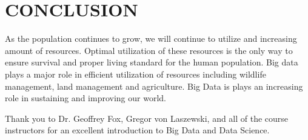 \documentclass[sigconf]{acmart}
\begin{document}
\section{CONCLUSION}
As the population continues to grow, we will continue to utilize and increasing amount of resources.  Optimal utilization of these resources is the only way to ensure survival and proper living standard for the human population.  Big data plays a major role in efficient utilization of resources including wildlife management, land management and agriculture.  Big Data is plays an increasing role in sustaining and improving our world.  

\begin{acks}

Thank you to Dr. Geoffrey Fox, Gregor von Laszewski, and all of the
course instructors for an excellent introduction to Big Data and Data
Science.

\end{acks}



 
\end{document}
